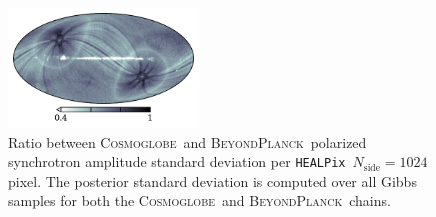 \documentclass[twocolumn]{../../common/aa}
\def\WMAP{\emph{WMAP}}
\def\WMAPnine{\emph{WMAP9}}
\def\Planck{\emph{Planck}}
\def\healpix{\texttt{HEALPix}}
\def\commanderthree{\texttt{Commander3}}
\newcommand{\bp}{\textsc{BeyondPlanck}}
\newcommand{\cosmoglobe}{\textsc{Cosmoglobe}}
\newcommand{\K}[0]{\textit K}
\begin{document}



\begin{figure}
	\centering
	\includegraphics[width=0.45\textwidth]{figures/polint_sigma_ratio.pdf}
	\caption{
		Ratio between \cosmoglobe\ and \bp\ polarized synchrotron amplitude standard deviation per \healpix\ $N_{\mathrm{side}}=1024$ pixel. The posterior standard deviation is computed over all Gibbs samples for both the \cosmoglobe\ and \bp\ chains.
		}
		\label{fig:rms_ratios}
\end{figure}
\end{document}
